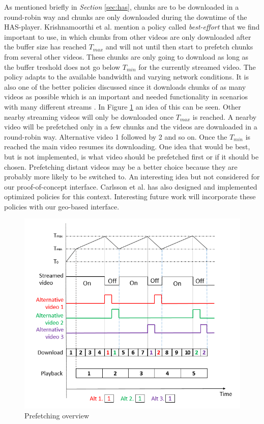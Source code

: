 As mentioned briefly in \textit{Section} \ref{sec:has}, chunks are to be downloaded in a round-robin way and chunks are only downloaded during the downtime of the HAS-player. Krishnamoorthi et al. \cite{bandawarePrefetch} mention a policy called \textit{best-effort} that we find important to use, in which chunks from other videos are only downloaded after the buffer size has reached $T_{max}$ and will not until then start to prefetch chunks from several other videos. These chunks are only going to download as long as the buffer treshold does not go below $T_{min}$ for the currently streamed video. The policy adapts to the available bandwidth and varying network conditions. It is also one of the better policies discussed since it downloads chunks of as many videos as possible which is an important and needed functionality in scenarios with many different streams \cite{bandawarePrefetch}. In Figure \ref{fig:prefetch} an idea of this can be seen. Other nearby streaming videos will only be downloaded once $T_{max}$ is reached. A nearby video will be prefetched only in a few chunks and the videos are downloaded in a round-robin way. Alternative video 1 followed by 2 and so on. Once the $T_{min}$ is reached the main video resumes its downloading. One idea that would be best, but is not implemented, is what video should be prefetched first or if it should be chosen. Prefetching distant videos may be a better choice because they are probably more likely to be switched to. An interesting idea but not considered for our proof-of-concept interface. Carlsson et al. \cite{optimizedstreaming} has also designed and implemented optimized policies for this context. Interesting future work will incorporate these policies with our geo-based interface.

\begin{figure}[ht!]
\begin{center}
	\includegraphics[scale=0.6]{prefetch.png}
	\caption{Prefetching overview}
	\label{fig:prefetch}
\end{center}
\end{figure}

